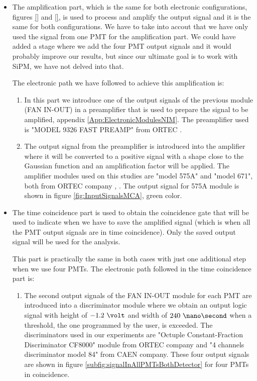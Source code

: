\begin{itemize}

\item{} The amplification part, which is the same for both electronic configurations, figures \ref{} and \ref{}, is used to process and amplify the output signal and it is the same for both configurations. We have to take into accout that we have only used the signal from one PMT for the amplification part. We could have added a stage where we add the four PMT output signals and it would probably improve our results, but since our ultimate goal is to work with SiPM, we have not delved into that.

The electronic path we have followed to achieve this amplification is:

\begin{enumerate}

\item{} In this part we introduce one of the output signals of the previous module (FAN IN-OUT) in a preamplifier that is used to prepare the signal to be amplified, appendix \ref{App:ElectronicModulesNIM}. The preamplifier used is "MODEL 9326 FAST PREAMP" from ORTEC \cite{DataSheetPreAmp}.

\item{} The output signal from the preamplifier is introduced into the amplifier where it will be converted to a positive signal with a shape close to the Gaussian function and an amplification factor will be applied. The amplifier modules used on this studies are "model 575A" and "model 671", both from ORTEC company \cite{DataSheet575Amp}, \cite{DataSheet671Amp}. The output signal for 575A module is shown in figure \ref{fig:InputSignalsMCA}, green color.

\end{enumerate}

\item{} The time coincidence part is used to obtain the coincidence gate that will be used to indicate when we have to save the amplified signal (which is when all the PMT output signals are in time coincidence). Only the saved output signal will be used for the analysis. 

This part is practically the same in both cases with just one additional step when we use four PMTs. The electronic path followed in the time coincidence part is:

\begin{enumerate}

\item{} The second output signals of the FAN IN-OUT module for each PMT are introduced into a discriminator module where we obtain an output logic signal with height of $-1.2~\volt$ and width of $240~\nano\second$ when a threshold, the one programmed by the user, is exceeded. The discriminators used in our experiments are  "Octuple Constant-Fraction Discriminator CF8000" module from ORTEC company \cite{DataSheetDiscriminator} and "4 channels discriminator model 84" from CAEN company. These four output signals are shown in figure \ref{subfig:signalInAllPMTsBothDetector} for four PMTs in coincidence.


\end{enumerate}
\end{itemize}
